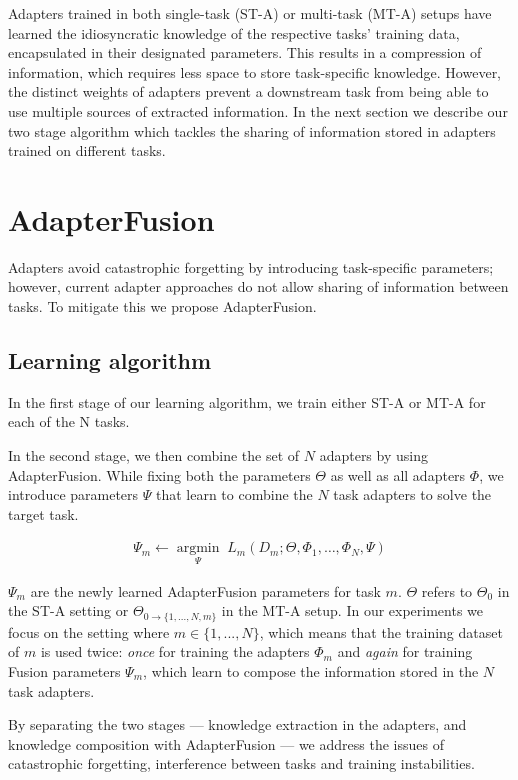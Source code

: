 Adapters trained in both single-task (ST-A) or multi-task (MT-A) setups have learned the idiosyncratic knowledge of the respective tasks' training data, encapsulated in their  designated parameters. This results in a compression of information, which requires less space to store task-specific knowledge. However, the distinct weights of adapters prevent a downstream task from being able to use multiple sources of extracted information. In the next section we describe our two stage algorithm which tackles the sharing of information stored in adapters trained on different tasks.

\section{AdapterFusion}
\label{fusion}

Adapters avoid catastrophic forgetting by introducing task-specific parameters; however, current adapter approaches do not allow sharing of information between tasks. To mitigate this we propose AdapterFusion.

\subsection{Learning algorithm}
\label{sec:fusion:learning}
In the first stage of our learning algorithm, we train either ST-A or MT-A for each of the N tasks. 

In the second stage, we then combine the set of $N$ adapters by using AdapterFusion. While fixing both the parameters $\Theta$ as well as all adapters $\Phi$, we introduce parameters $\Psi$ that learn to combine the $N$ task adapters to solve the target task.

\begin{gather*}
    \Psi_m \leftarrow \underset{\Psi}{\operatorname{argmin}}\;L_m(D_m;\Theta,\Phi_1,\ldots,\Phi_N, \Psi) 
\end{gather*}

$\Psi_m$ are the newly learned AdapterFusion parameters for task $m$. $\Theta$ refers to $\Theta_0$ in the ST-A setting or $\Theta_{0 \rightarrow \{1, ..., N,m\}}$ in the MT-A setup.  In our experiments we focus on the setting where $m \in \{1,...,N\}$, which means that the training dataset of $m$ is used twice: \textit{once} for training the adapters $\Phi_m$ and \textit{again} for training Fusion  parameters $\Psi_m$, which learn to compose the information stored in the $N$ task adapters. 

By separating the two stages --- knowledge extraction in the adapters, and knowledge composition with AdapterFusion --- we address the issues of catastrophic forgetting, interference between tasks and training instabilities. 

